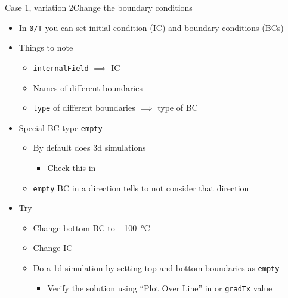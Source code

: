 \begin{frame}{Case 1, variation 2}{Change the boundary conditions}
    \begin{itemize}
        \setitemsep{1em}
        \item In \texttt{0/T} you can set initial condition (IC) and boundary conditions (BCs)
        \item Things to note
        \begin{itemize}
            \item \texttt{internalField} $\implies$ IC
            \item Names of different boundaries
            \item \texttt{type} of different boundaries $\implies$ type of BC
        \end{itemize}
        \item Special BC type \texttt{empty}
        \begin{itemize}
            \item By default \openfoam{} does 3d simulations
            \begin{itemize}
                \item Check this in \paraview
            \end{itemize}
            \item \texttt{empty} BC in a direction tells \openfoam{} to not consider that direction
        \end{itemize}
        \item Try
        \begin{itemize}
            \item Change bottom BC to \qty{-100}{\degreeCelsius}
            \item Change IC
            \item Do a 1d simulation by setting top and bottom boundaries as \texttt{empty}
            \begin{itemize}
                \item Verify the solution using ``Plot Over Line'' in \paraview{} or \texttt{gradTx} value
            \end{itemize}
        \end{itemize}
    \end{itemize}
\end{frame}

